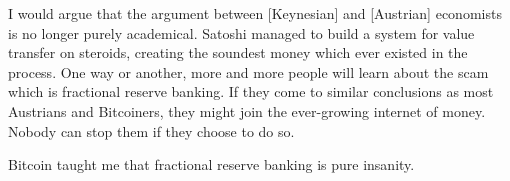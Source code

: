I would argue that the argument between [Keynesian] and [Austrian]
economists is no longer purely academical. Satoshi managed to build a
system for value transfer on steroids, creating the soundest money which
ever existed in the process. One way or another, more and more people
will learn about the scam which is fractional reserve banking. If they
come to similar conclusions as most Austrians and Bitcoiners, they might
join the ever-growing internet of money. Nobody can stop them if they
choose to do so.

Bitcoin taught me that fractional reserve banking is pure insanity.

%
%
%
%
%
